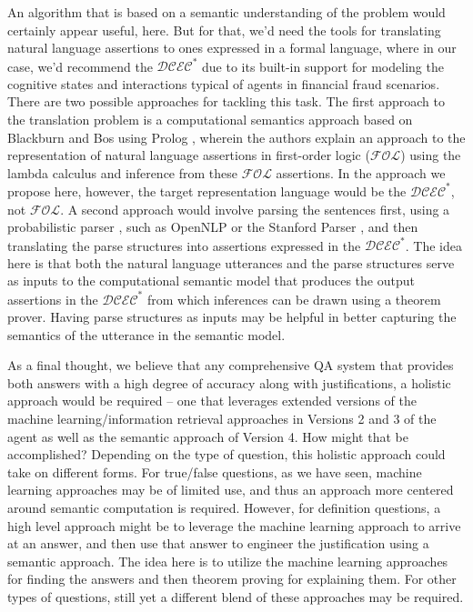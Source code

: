 An algorithm that is based on a semantic understanding of the problem would certainly appear useful, here. But for that, we'd need the tools for translating natural language assertions to ones expressed in a formal language, where in our case, we'd recommend the $\mathcal{DCEC}^\ast$ due to its built-in support for modeling the cognitive states and interactions typical of agents in financial fraud scenarios. There are two possible approaches for tackling this task. The first approach to the translation problem is a computational semantics approach based on Blackburn and Bos \cite{blackburn_2005_representation_ch1, blackburn_2005_representation_ch2, blackburn_2005_representation_ch3, blackburn_2005_representation_ch4, blackburn_2005_representation_ch5, blackburn_2005_representation_ch6} using Prolog \cite{
blackburn_2006_prolog_ch7,
blackburn_2006_prolog_ch8,
blackburn_2006_prolog_ch9,
blackburn_2006_prolog_ch10,
blackburn_2006_prolog_ch11,
blackburn_2006_prolog_ch12}, wherein the authors explain an approach to the representation of natural language assertions in first-order logic ($\mathcal{FOL}$) \cite{blackburn_2005_representation_ch1} using the lambda calculus \cite{blackburn_2005_representation_ch2} and inference \cite{blackburn_2005_representation_ch4, blackburn_2005_representation_ch5} from these $\mathcal{FOL}$ assertions. In the approach we propose here, however, the target representation language would be the $\mathcal{DCEC}^\ast$, not $\mathcal{FOL}$.  A second approach would involve parsing the sentences first, using a probabilistic parser \cite{martin_2000_speech_ch14}, such as OpenNLP \cite{opennlp} or the Stanford Parser \cite{stanford_parser}, and then translating the parse structures into assertions expressed in the $\mathcal{DCEC}^\ast$.  The idea here is that both the natural language utterances and the parse structures serve as inputs to the computational semantic model that produces the output assertions in the $\mathcal{DCEC}^\ast$ from which inferences can be drawn using a theorem prover.  Having parse structures as inputs may be helpful in better capturing the semantics of the utterance in the semantic model. 

As a final thought, we believe that any comprehensive QA system that provides both answers with a high degree of accuracy along with justifications, a holistic approach would be required – one that leverages extended versions of the machine learning/information retrieval approaches in Versions 2 and 3 of the agent as well as the semantic approach of Version 4. How might that be accomplished? Depending on the type of question, this holistic approach could take on different forms. For true/false questions, as we have seen, machine learning approaches may be of limited use, and thus an approach more centered around semantic computation is required.  However, for definition questions, a high level approach might be to leverage the machine learning approach to arrive at an answer, and then use that answer to engineer the justification using a semantic approach.  The idea here is to utilize the machine learning approaches for finding the answers and then theorem proving for explaining them. For other types of questions, still yet a different blend of these approaches may be required.